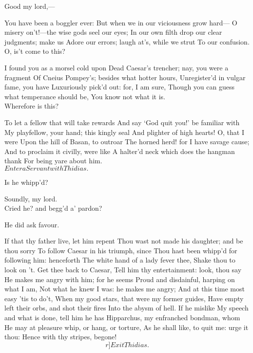 \documentclass{book}
\begin{document}
\2	Good my lord,---

\1	You have been a boggler ever:
	But when we in our viciousness grow hard---
	O misery on't!---the wise gods seel our eyes;
	In our own filth drop our clear judgments; make us
	Adore our errors; laugh at's, while we strut
	To our confusion. \\

\2	                  O, is't come to this?

\1	I found you as a morsel cold upon
	Dead Caesar's trencher; nay, you were a fragment
	Of Cneius Pompey's; besides what hotter hours,
	Unregister'd in vulgar fame, you have
	Luxuriously pick'd out: for, I am sure,
	Though you can guess what temperance should be,
	You know not what it is. \\

\2	Wherefore is this?

\1	To let a fellow that will take rewards
	And say `God quit you!' be familiar with
	My playfellow, your hand; this kingly seal
	And plighter of high hearts! O, that I were
	Upon the hill of Basan, to outroar
	The horned herd! for I have savage cause;
	And to proclaim it civilly, were like
	A halter'd neck which does the hangman thank
	For being yare about him. \\

	\(Enter a Servant with Thidias.\)

		    Is he whipp'd?

	Soundly, my lord. \\

\1	                  Cried he? and begg'd a' pardon?

	He did ask favour.

\1	If that thy father live, let him repent
	Thou wast not made his daughter; and be thou sorry
	To follow Caesar in his triumph, since
	Thou hast been whipp'd for following him: henceforth
	The white hand of a lady fever thee,
	Shake thou to look on 't. Get thee back to Caesar,
	Tell him thy entertainment: look, thou say
	He makes me angry with him; for he seems
	Proud and disdainful, harping on what I am,
	Not what he knew I was: he makes me angry;
	And at this time most easy 'tis to do't,
	When my good stars, that were my former guides,
	Have empty left their orbs, and shot their fires
	Into the abysm of hell. If he mislike
	My speech and what is done, tell him he has
	Hipparchus, my enfranched bondman, whom
	He may at pleasure whip, or hang, or torture,
	As he shall like, to quit me: urge it thou:
	Hence with thy stripes, begone! \[r]Exit Thidias.\]
\end{document}
